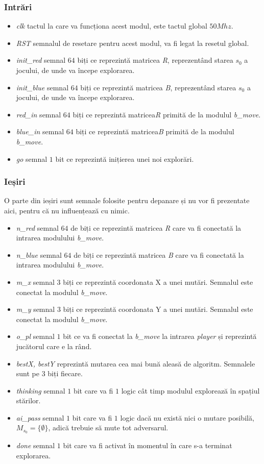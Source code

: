 \documentclass[12pt,twoside,a4paper,fleqn]{book}
\theoremstyle{definition}
\begin{document}
\subsubsection{Intrări}
\begin{itemize}
\item \emph{clk} tactul la care va funcționa acest modul, este tactul global $50Mhz$.
\item \emph{RST} semnalul de resetare pentru acest modul, va fi legat la resetul global.

\item \emph{init\_red} semnal $64$ biți ce reprezintă matricea \emph{R}, reprezentând starea $s_{0}$ a jocului, de unde va începe explorarea.
\item \emph{init\_blue} semnal $64$ biți ce reprezintă matricea \emph{B}, reprezentând starea $s_{0}$ a jocului, de unde va începe explorarea.
\item \emph{red\_in} semnal $64$ biți ce reprezintă matricea\emph{R} primită de la modulul \emph{b\_move}.
\item \emph{blue\_in} semnal $64$ biți ce reprezintă matricea\emph{B} primită de la modulul \emph{b\_move}.
\item \emph{go} semnal $1$ bit ce reprezintă inițierea unei noi explorări.
\end{itemize}

\subsubsection{Ieșiri}
O parte din ieșiri sunt semnale folosite pentru depanare și nu vor fi prezentate aici, pentru că nu influențează cu nimic.
\begin{itemize}
\item \emph{n\_red} semnal $64$ de biți ce reprezintă matricea \emph{R} care va fi conectată la intrarea modulului \emph{b\_move}.
\item \emph{n\_blue} semnal $64$ de biți ce reprezintă matricea \emph{B} care va fi conectată la intrarea modulului \emph{b\_move}.
\item \emph{m\_x} semnal $3$ biți ce reprezintă coordonata X a unei mutări. Semnalul este conectat la modulul \emph{b\_move}.
\item \emph{m\_y} semnal $3$ biți ce reprezintă coordonata Y a unei mutări. Semnalul este conectat la modulul \emph{b\_move}.
\item \emph{o\_pl} semnal $1$ bit ce va fi conectat la \emph{b\_move} la intrarea \emph{player} și reprezintă jucătorul care e la rând.
\item \emph{bestX, bestY} reprezintă mutarea cea mai bună aleasă de algoritm. Semnalele sunt pe $3$ biți fiecare.
\item \emph{thinking} semnal $1$ bit care va fi $1$ logic cât timp modulul explorează în spațiul stărilor.
\item \emph{ai\_pass} semnal $1$ bit care va fi $1$ logic dacă nu există nici o mutare posibilă, $M_{s_{0}} = \{\emptyset\}$, adică trebuie să mute tot adversarul.
\item \emph{done} semnal $1$ bit care va fi activat în momentul în care s-a terminat explorarea.
\end{itemize}
\end{document}
